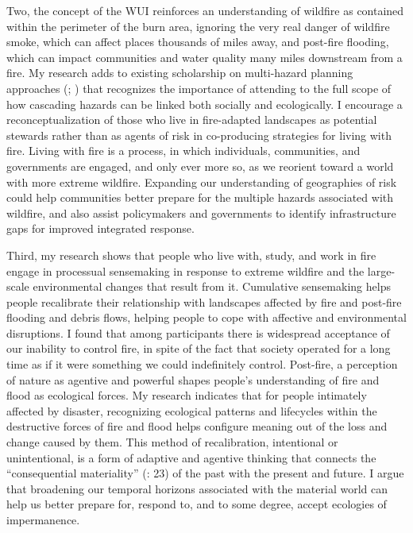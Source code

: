 \documentclass[
]{article}
\begin{document}
Two, the concept of the WUI reinforces an understanding of wildfire as contained within the perimeter of the burn area, ignoring the very real danger of wildfire smoke, which can affect places thousands of miles away, and post-fire flooding, which can impact communities and water quality many miles downstream from a fire. My research adds to existing scholarship on multi-hazard planning approaches (; ) that recognizes the importance of attending to the full scope of how cascading hazards can be linked both socially and ecologically. I encourage a reconceptualization of those who live in fire-adapted landscapes as potential stewards rather than as agents of risk in co-producing strategies for living with fire. Living with fire is a process, in which individuals, communities, and governments are engaged, and only ever more so, as we reorient toward a world with more extreme wildfire. Expanding our understanding of geographies of risk could help communities better prepare for the multiple hazards associated with wildfire, and also assist policymakers and governments to identify infrastructure gaps for improved integrated response.

Third, my research shows that people who live with, study, and work in fire engage in processual sensemaking in response to extreme wildfire and the large-scale environmental changes that result from it. Cumulative sensemaking helps people recalibrate their relationship with landscapes affected by fire and post-fire flooding and debris flows, helping people to cope with affective and environmental disruptions. I found that among participants there is widespread acceptance of our inability to control fire, in spite of the fact that society operated for a long time as if it were something we could indefinitely control. Post-fire, a perception of nature as agentive and powerful shapes people's understanding of fire and flood as ecological forces. My research indicates that for people intimately affected by disaster, recognizing ecological patterns and lifecycles within the destructive forces of fire and flood helps configure meaning out of the loss and change caused by them. This method of recalibration, intentional or unintentional, is a form of adaptive and agentive thinking that connects the ``consequential materiality'' (: 23) of the past with the present and future. I argue that broadening our temporal horizons associated with the material world can help us better prepare for, respond to, and to some degree, accept ecologies of impermanence.
\end{document}
